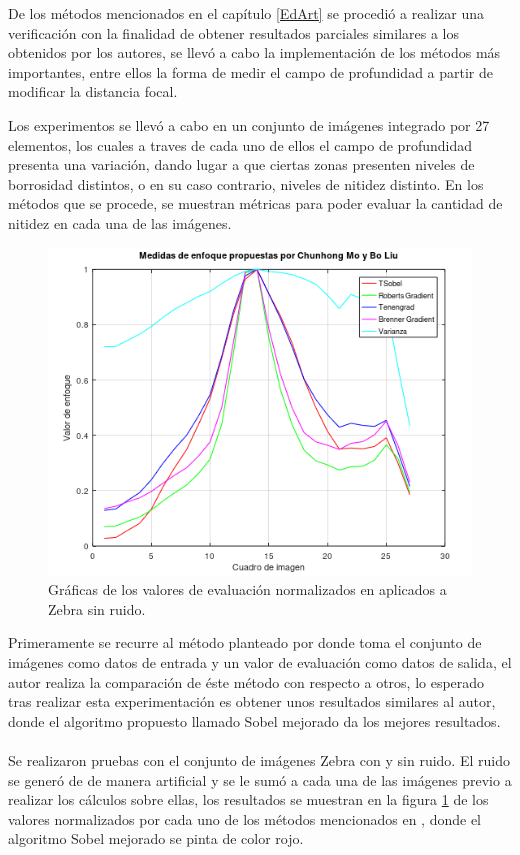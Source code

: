 
De los métodos mencionados en el capítulo \ref{EdArt} se procedió a realizar una verificación con la finalidad de obtener resultados parciales similares a los obtenidos por los autores, se llevó a cabo la implementación de los métodos más importantes, entre ellos la forma de medir el campo de profundidad a partir de modificar la distancia focal.

Los experimentos se llevó a cabo en un conjunto de imágenes integrado por 27 elementos, los cuales a traves de cada uno de ellos el campo de profundidad presenta una variación, dando lugar a que ciertas zonas presenten niveles de borrosidad distintos, o en su caso contrario, niveles de nitidez distinto. En los métodos que se procede, se muestran métricas para poder evaluar la cantidad de nitidez en cada una de las imágenes.

\begin{figure}
\centering
\includegraphics[width=\textwidth]{GraficosExperimentacion/sobelSinRuido.PNG}
\caption{Gráficas de los valores de evaluación normalizados en \citet{Mo2012} aplicados a Zebra sin ruido. }
\label{SalidaTSobelSinRuido}
\end{figure}

 Primeramente se recurre al método planteado por \citet{Mo2012} donde toma el conjunto de imágenes como datos de entrada y  un valor de evaluación como datos de salida, el autor realiza la comparación de éste método con respecto a otros, lo esperado tras realizar esta experimentación es obtener unos resultados similares al autor, donde el algoritmo propuesto llamado Sobel mejorado da los mejores resultados. 
\\
\\
Se realizaron pruebas con el conjunto de imágenes Zebra con y sin ruido. El ruido se generó de de manera artificial y se le sumó a cada una de las imágenes previo a realizar los cálculos sobre ellas, los resultados se muestran en la figura \ref{SalidaTSobelSinRuido} de los valores normalizados por cada uno de los métodos mencionados en \citet{Mo2012}, donde el algoritmo Sobel mejorado se pinta de color rojo.

